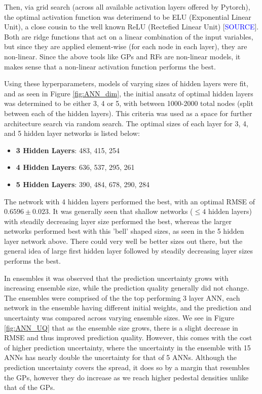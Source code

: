 \documentclass[a4paper, twoside, final, 12pt]{article}
\begin{document}
{Then, via grid search (across all available activation layers offered by Pytorch), the optimal activation function was deterimend to be ELU (Exponential Linear Unit), a close cousin to the well known ReLU (Rectefied Linear Unit) [\textcolor{blue}{SOURCE}]. Both are ridge functions that act on a linear combination of the input variables, but since they are applied element-wise (for each node in each layer), they are non-linear. Since the above tools like GPs and RFs are non-linear models, it makes sense that a non-linear activation function performs the best. 

Using these hyperparameters, models of varying sizes of hidden layers were fit, and as seen in Figure \ref{fig:ANN_dim}, the initial ansatz of optimal hidden layers was determined to be either 3, 4 or 5, with between 1000-2000 total nodes (split between each of the hidden layers). This criteria was used as a space for further architecture search via random search.
The optimal sizes of each layer for 3, 4, and 5 hidden layer networks is listed below: 
\begin{itemize}
	\item \textbf{3 Hidden Layers}: 483, 415, 254
	\item \textbf{4 Hidden Layers}: 636, 537, 295, 261
	\item \textbf{5 Hidden Layers}: 390, 484, 678, 290, 284
\end{itemize} 
The network with 4 hidden layers performed the best, with an optimal RMSE of $0.6596 \pm 0.023$. 
It was generally seen that shallow networks ($\leq 4$ hidden layers) with steadily decreasing layer size performed the best, whereas the larger networks performed best with this 'bell' shaped sizes, as seen in the 5 hidden layer network above. 
There could very well be better sizes out there, but the general idea of large first hidden layer followed by steadily decreasing layer sizes performs the best.

In ensembles it was observed that the prediction uncertainty grows with increasing ensemble size, while the prediction quality generally did not change. The ensembles were comprised of the the top performing 3 layer ANN, each network in the ensemble having different initial weights, and the prediction and uncertainty was compared across varying ensemble sizes. We see in Figure \ref{fig:ANN_UQ} that as the ensemble size grows, there is a slight decrease in RMSE and thus improved prediction quality. However, this comes with the cost of higher prediction uncertainty, where the uncertainty in the ensemble with 15 ANNs has nearly double the uncertainty for that of 5 ANNs. Although the prediction uncertainty covers the spread, it does so by a margin that resembles the GPs, however they do increase as we reach higher pedestal densities unlike that of the GPs. 

}
\end{document}
